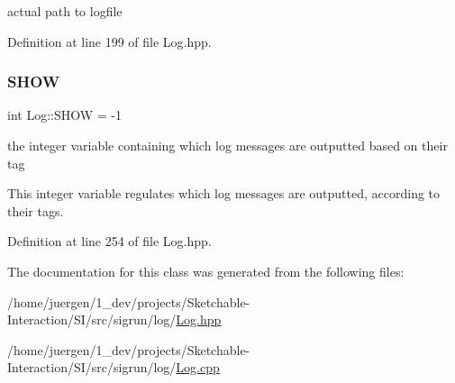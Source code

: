 actual path to logfile 

Definition at line 199 of file Log.\+hpp.

\mbox{\label{class_log_a543d481ed0f4464f5190f5ef094bfc15}} 
\subsubsection{\texorpdfstring{SHOW}{SHOW}}
{\footnotesize\ttfamily int Log\+::\+S\+H\+OW = -\/1\hspace{0.3cm}{\ttfamily [static]}}



the integer variable containing which log messages are outputted based on their tag 

This integer variable regulates which log messages are outputted, according to their tags. 

Definition at line 254 of file Log.\+hpp.



The documentation for this class was generated from the following files\+:\begin{DoxyCompactItemize}
\item 
/home/juergen/1\+\_\+dev/projects/\+Sketchable-\/\+Interaction/\+S\+I/src/sigrun/log/\mbox{\hyperlink{_log_8hpp}{Log.\+hpp}}\item 
/home/juergen/1\+\_\+dev/projects/\+Sketchable-\/\+Interaction/\+S\+I/src/sigrun/log/\mbox{\hyperlink{_log_8cpp}{Log.\+cpp}}\end{DoxyCompactItemize}
